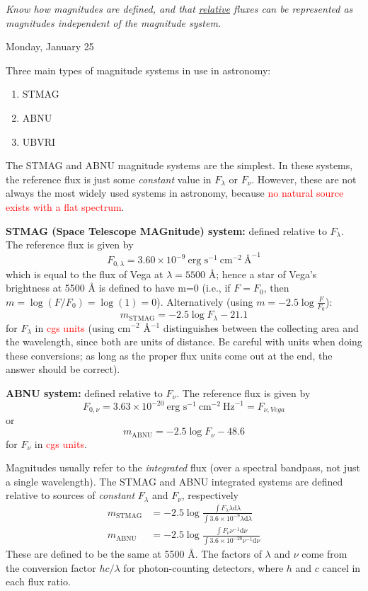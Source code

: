 \documentclass[12pt]{article}
\begin{document}
\textcolor{om}{\emph{Know how magnitudes are defined, and that
\underline{relative} fluxes can be represented as magnitudes independent of the
magnitude system.}}

\textcolor{date}{Monday, January 25}

Three main types of magnitude systems in use in astronomy:
\begin{enumerate}
    \item STMAG
    \item ABNU
    \item UBVRI
\end{enumerate}
The STMAG and ABNU magnitude systems are the simplest.
In these systems, the reference flux is just some \emph{constant} value in
$F_{\lambda}$ or $F_{\nu}$. However, these are not always the most widely used
systems in astronomy, because
\textcolor{red}{no natural source exists with a flat spectrum}.

\textbf{STMAG (Space Telescope MAGnitude) system:}
defined relative to $F_{\lambda}$. The reference flux is given by
$$    F_{0,\lambda} = 3.60 \times 10^{-9}\ \textrm{erg\ s}^{-1}\
    \textrm{cm}^{-2}\ \textrm{\AA{}}^{-1} $$
which is equal to the flux of Vega at $\lambda = 5500$ \AA{};
hence a star of Vega's brightness at 5500 \AA{} is defined to have m=0
(i.e., if $F = F_{0}$, then $m=\log(F/F_{0}) = \log(1) = 0$).
Alternatively (using $m = -2.5\log \frac{F}{F_0}$):
$$    m_{\textrm{STMAG}} = -2.5 \log F_{\lambda} - 21.1 $$
for $F_{\lambda}$ in \textcolor{red}{cgs units} (using cm$^{-2}$ \AA{}$^{-1}$
distinguishes between the collecting area and the wavelength, since both are
units of distance. Be careful with units when doing these conversions; as
long as the proper flux units come out at the end, the answer should be
correct).

\textbf{ABNU system:}
defined relative to $F_{\nu}$. The reference flux is given by
$$ F_{0,\nu} = 3.63 \times 10^{-20}\ \textrm{erg\ s}^{-1}\
    \textrm{cm}^{-2}\ \textrm{Hz}^{-1} = F_{\nu,Vega} $$
or
$$     m_{\textrm{ABNU}} = -2.5 \log F_{\nu} - 48.6 $$
for $F_{\nu}$ in \textcolor{red}{cgs units}.

Magnitudes usually refer to the \emph{integrated} flux (over a
spectral bandpass, not just a single wavelength).
The STMAG and ABNU integrated systems are defined relative to sources
of \emph{constant} $F_{\lambda}$ and $F_{\nu}$, respectively
\begin{align*}
    m_{\textrm{STMAG}} &= -2.5 \log \frac{\int F_{\lambda} \lambda
    \textrm{d}\lambda}{\int3.6\times10^{-9}\lambda\textrm{d}\lambda}\\
    m_{\textrm{ABNU}} &= -2.5 \log \frac{\int F_{\nu}\nu^{-1}
\textrm{d}\nu}{\int 3.6 \times 10^{-20}\nu^{-1}\textrm{d}\nu}
\end{align*}
These are defined to be the same at 5500 \AA{}.
The factors of $\lambda$ and $\nu$ come from the conversion factor
$hc/\lambda$ for photon-counting detectors, where $h$ and $c$ cancel
in each flux ratio.
\end{document}

